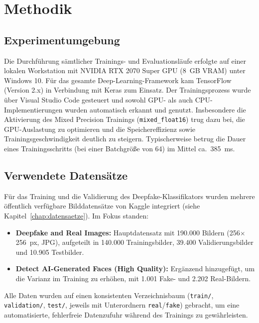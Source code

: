 \chapter{Methodik}
\label{chap:methodik}

\section{Experimentumgebung}

Die Durchführung sämtlicher Trainings- und Evaluationsläufe erfolgte auf einer lokalen Workstation mit NVIDIA RTX 2070 Super GPU (8~GB VRAM) unter Windows 10. Für das gesamte Deep-Learning-Framework kam TensorFlow (Version 2.x) in Verbindung mit Keras zum Einsatz. Der Trainingsprozess wurde über Visual Studio Code gesteuert und sowohl GPU- als auch CPU-Implementierungen wurden automatisch erkannt und genutzt. Insbesondere die Aktivierung des Mixed Precision Trainings (\texttt{mixed\_float16}) trug dazu bei, die GPU-Auslastung zu optimieren und die Speichereffizienz sowie Trainingsgeschwindigkeit deutlich zu steigern. Typischerweise betrug die Dauer eines Trainingsschritts (bei einer Batchgröße von 64) im Mittel ca.~385~ms.

\section{Verwendete Datensätze}

Für das Training und die Validierung des Deepfake-Klassifikators wurden mehrere öffentlich verfügbare Bilddatensätze von Kaggle integriert (siehe Kapitel~\ref{chap:datensaetze}). Im Fokus standen:

\begin{itemize}
  \item \textbf{Deepfake and Real Images:}  
    Hauptdatensatz mit 190.000 Bildern (256$\times$256~px, JPG), aufgeteilt in 140.000 Trainingsbilder, 39.400 Validierungsbilder und 10.905 Testbilder.
  \item \textbf{Detect AI-Generated Faces (High Quality):}  
    Ergänzend hinzugefügt, um die Varianz im Training zu erhöhen, mit 1.001 Fake- und 2.202 Real-Bildern.
\end{itemize}

Alle Daten wurden auf einen konsistenten Verzeichnisbaum (\texttt{train/}, \texttt{validation/}, \texttt{test/}, jeweils mit Unterordnern \texttt{real}/\texttt{fake}) gebracht, um eine automatisierte, fehlerfreie Datenzufuhr während des Trainings zu gewährleisten.

